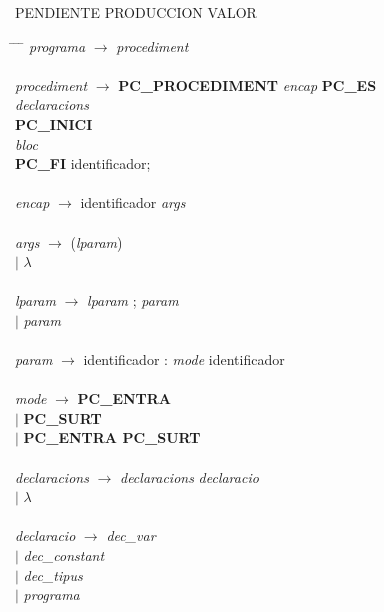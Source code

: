 \documentclass[10pt]{report}
\begin{document}
    PENDIENTE PRODUCCION VALOR
    \begin{tabbing}
    \hspace*{2.0cm} \= \hspace*{0.5cm} \= \hspace*{0.8cm} \= \kill
        \textit{programa} \> $\rightarrow $ \> \textit{procediment} \\
        \\
        \textit{procediment} \> $ \rightarrow $ \> \textbf{PC\_PROCEDIMENT} \textit{encap} \textbf{PC\_ES} \\
        \> \> \> \textit{declaracions} \\
        \> \> \textbf{PC\_INICI} \\
        \> \> \> \textit{bloc} \\
        \> \> \textbf{PC\_FI} identificador; \\
        \\
        \textit{encap} \> $ \rightarrow $ \> identificador \textit{args} \\
        \\
        \textit{args} \> $\rightarrow$ \> (\textit{lparam}) \\
        \> $ \mid $ \> $ \lambda $ \\
        \\
        \textit{lparam} \> $\rightarrow$ \> \textit{lparam} ; \textit{param} \\
        \> $\mid$ \> \textit{param} \\
        \\
        \textit{param} \> $\rightarrow$ \> identificador : \textit{mode} identificador \\
        \\
        \textit{mode} \> $\rightarrow$ \> \textbf{PC\_ENTRA} \\
        \> $\mid$ \> \textbf{PC\_SURT} \\
        \> $\mid$ \> \textbf{PC\_ENTRA PC\_SURT} \\
        \\
        \textit{declaracions} \> $\rightarrow$ \> \textit{declaracions} \textit{declaracio} \\
        \> $\mid$ \> $\lambda$ \\
        \\
        \textit{declaracio} \> $\rightarrow$ \> \textit{dec\_var} \\
        \> $\mid$ \> \textit{dec\_constant} \\
        \> $\mid$ \> \textit{dec\_tipus} \\
        \> $\mid$ \> \textit{programa} \\
        \\
        

\end{tabbing}
\end{document}
